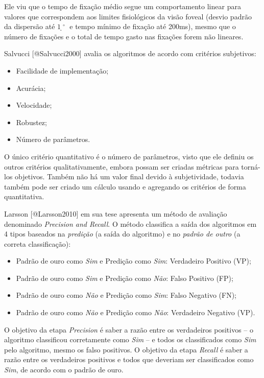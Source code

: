 Ele viu que o tempo de fixação médio segue um comportamento linear para
valores que correspondem aos limites fisiológicos da visão foveal
(desvio padrão da dispersão até $1̣^\circ$ e tempo mínimo de fixação até
200ms), mesmo que o número de fixações e o total de tempo gasto nas
fixações forem não lineares.

Salvucci {[}@Salvucci2000{]} avalia os algoritmos de acordo com
critérios subjetivos:

\begin{itemize}
\itemsep1pt\parskip0pt
\item
  Facilidade de implementação;
\item
  Acurácia;
\item
  Velocidade;
\item
  Robustez;
\item
  Número de parâmetros.
\end{itemize}

O único critério quantitativo é o número de parâmetros, visto que ele
definiu os outros critérios qualitativamente, embora possam ser criadas
métricas para torná-los objetivos. Também não há um valor final devido à
subjetividade, todavia também pode ser criado um cálculo usando e
agregando os critérios de forma quantitativa.

Larsson {[}@Larsson2010{]} em sua tese apresenta um método de avaliação
denominado \emph{Precision and Recall}. O método classifica a saída dos
algoritmos em 4 tipos baseados na \emph{predição} (a saída do algoritmo)
e no \emph{padrão de outro} (a correta classificação):

\begin{itemize}
\itemsep1pt\parskip0pt
\item
  Padrão de ouro como \emph{Sim} e Predição como \emph{Sim}: Verdadeiro
  Positivo (VP);
\item
  Padrão de ouro como \emph{Sim} e Predição como \emph{Não}: Falso
  Positivo (FP);
\item
  Padrão de ouro como \emph{Não} e Predição como \emph{Sim}: Falso
  Negativo (FN);
\item
  Padrão de ouro como \emph{Não} e Predição como \emph{Não}: Verdadeiro
  Negativo (VP).
\end{itemize}

O objetivo da etapa \emph{Precision} é saber a razão entre os
verdadeiros positivos -- o algoritmo classificou corretamente como
\emph{Sim} -- e todos os classificados como \emph{Sim} pelo algoritmo,
mesmo os falso positivos. O objetivo da etapa \emph{Recall} é saber a
razão entre os verdadeiros positivos e todos que deveriam ser
classificados como \emph{Sim}, de acordo com o padrão de ouro.

